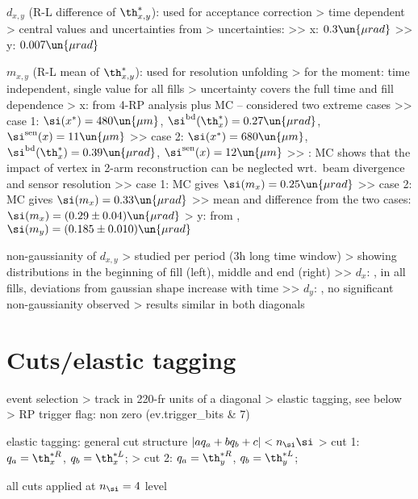 \> $d_{x, y}$ (R-L difference of $\th_{x, y}^*$): used for acceptance correction
\>> time dependent
\>> central values and uncertainties from 
\>> uncertainties:
\>>> x: $0.3\un{\mu rad}$
\>>> y: $0.007\un{\mu rad}$

\> $m_{x, y}$ (R-L mean of $\th_{x, y}^*$): used for resolution unfolding
\>> for the moment: time independent, single value for all fills
\>> uncertainty covers the full time and fill dependence
\>> x: from 4-RP analysis plus MC -- considered two extreme cases
\>>> case 1: $\si(x^*) = 480\un{\mu m}$, $\si^{\rm bd}(\th^*_x) = 0.27\un{\mu rad}$, $\si^{\rm sen}(x) = 11\un{\mu m}$
\>>> case 2: $\si(x^*) = 680\un{\mu m}$, $\si^{\rm bd}(\th^*_x) = 0.39\un{\mu rad}$, $\si^{\rm sen}(x) = 12\un{\mu m}$
\>>> : MC shows that the impact of vertex in 2-arm reconstruction can be neglected wrt.~beam divergence and sensor resolution
\>>> case 1: MC gives $\si(m_x) = 0.25\un{\mu rad}$
\>>> case 2: MC gives $\si(m_x) = 0.33\un{\mu rad}$
\>>> mean and difference from the two cases: $\si(m_x) = (0.29 \pm 0.04)\un{\mu rad}$
\>> y: from , $\si(m_y) = (0.185 \pm 0.010)\un{\mu rad}$

\> non-gaussianity of $d_{x,y}$
\>> studied per period (3h long time window)
\>> showing distributions in the beginning of fill (left), middle and end (right)
\>>> $d_x$: , in all fills, deviations from gaussian shape increase with time
\>>> $d_y$: , no significant non-gaussianity observed
\>> results similar in both diagonals


\chapter{Cuts/elastic tagging}

\> event selection
\>> track in 220-fr units of a diagonal
\>> elastic tagging, see below
\>> RP trigger flag: non zero (ev.trigger\_bits \& 7)

\> elastic tagging: general cut structure $| a q_a + b q_b + c| < n_\si  \si$
\>> cut 1: $q_a = \th_x^{*R}$, $q_b = \th_x^{*L}$; 
\>> cut 2: $q_a = \th_y^{*R}$, $q_b = \th_y^{*L}$; 

\> all cuts applied at $n_\si = 4$ level

